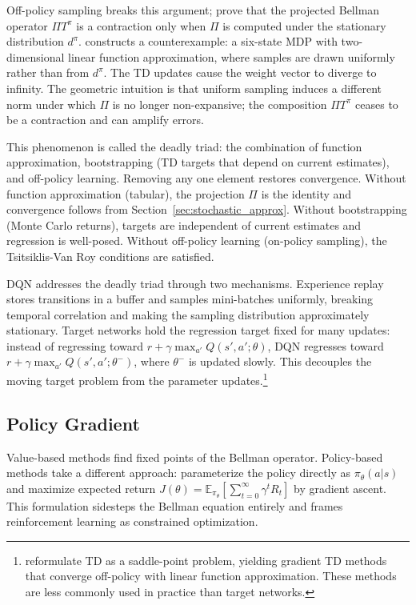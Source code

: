 Off-policy sampling breaks this argument; \citet{tsitsiklis1997} prove that the projected Bellman operator $\Pi T^\pi$ is a contraction only when $\Pi$ is computed under the stationary distribution $d^\pi$. \citet{Baird1995} constructs a counterexample: a six-state MDP with two-dimensional linear function approximation, where samples are drawn uniformly rather than from $d^\pi$. The TD updates cause the weight vector to diverge to infinity. The geometric intuition is that uniform sampling induces a different norm under which $\Pi$ is no longer non-expansive; the composition $\Pi T^\pi$ ceases to be a contraction and can amplify errors.

This phenomenon is called the deadly triad: the combination of function approximation, bootstrapping (TD targets that depend on current estimates), and off-policy learning. Removing any one element restores convergence. Without function approximation (tabular), the projection $\Pi$ is the identity and convergence follows from Section~\ref{sec:stochastic_approx}. Without bootstrapping (Monte Carlo returns), targets are independent of current estimates and regression is well-posed. Without off-policy learning (on-policy sampling), the Tsitsiklis-Van Roy conditions are satisfied.

DQN \citep{mnih2015} addresses the deadly triad through two mechanisms. Experience replay stores transitions in a buffer and samples mini-batches uniformly, breaking temporal correlation and making the sampling distribution approximately stationary. Target networks hold the regression target fixed for many updates: instead of regressing toward $r + \gamma \max_{a'} Q(s', a'; \theta)$, DQN regresses toward $r + \gamma \max_{a'} Q(s', a'; \theta^-)$, where $\theta^-$ is updated slowly. This decouples the moving target problem from the parameter updates.\footnote{\citet{sutton2009gtd} reformulate TD as a saddle-point problem, yielding gradient TD methods that converge off-policy with linear function approximation. These methods are less commonly used in practice than target networks.}


\subsection{Policy Gradient}
\label{sec:policy_gradient}

Value-based methods find fixed points of the Bellman operator. Policy-based methods take a different approach: parameterize the policy directly as $\pi_\theta(a|s)$ and maximize expected return $J(\theta) = \mathbb{E}_{\pi_\theta}[\sum_{t=0}^\infty \gamma^t R_t]$ by gradient ascent. This formulation sidesteps the Bellman equation entirely and frames reinforcement learning as constrained optimization.

